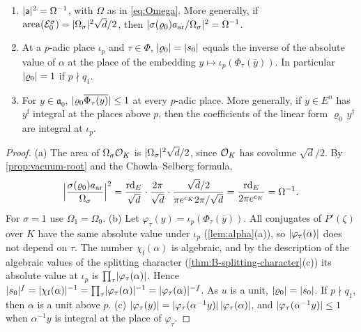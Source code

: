 \begin{proposition}\label{prop:jet-scale}
\begin{enumerate}[label=\textup{(\alph*)}]
\item $\lvert \mathsf a\rvert^2=\Omega^{-1}$, with $\Omega$ as in \eqref{eq:Omega}. More generally, if
$\mathrm{area}(\mathcal E_0^\sigma)=\lvert \Omega_\sigma\rvert^2\sqrt d/2$, then
$\lvert \sigma(\varrho_0)a_{\mathrm{ar}}/\Omega_\sigma\rvert^2=\Omega^{-1}$.
\item At a $p$-adic place $\iota_p$ and $\tau\in\Phi$, $\lvert \varrho_0\rvert=\lvert s_0\rvert$ equals the inverse
of the absolute value of $\alpha$ at the place of the embedding $y\mapsto\iota_p(\Phi_\tau(\bar y))$.
In particular $\lvert \varrho_0\rvert=1$ if $p\nmid q_1$.
\item For $y\in\mathfrak a_0$, $\lvert \varrho_0\overline{\Phi_\tau(y)}\rvert\le1$ at every $p$-adic place. More
generally, if $y\in E^n$ has $y^{\mathrm f}$ integral at the places above $p$, then the coefficients of
the linear form $\varrho_0\,y^\dagger$ are integral at $\iota_p$.
\end{enumerate}
\end{proposition}

\begin{proof}
(a) The area of $\Omega_\sigma\mathcal{O}_K$ is $\lvert \Omega_\sigma\rvert^2\sqrt d/2$, since $\mathcal{O}_K$ has covolume
$\sqrt d/2$. By \cref{prop:vacuum-root} and the Chowla--Selberg formula,
\[
  \Bigl|\frac{\sigma(\varrho_0)a_{\mathrm{ar}}}{\Omega_\sigma}\Bigr|^2
  =\frac{\mathrm{rd}_E}{\sqrt d}\cdot\frac{2\pi}{\sqrt d}\cdot\frac{\sqrt d/2}{\pi e^{c_K}2\pi/\sqrt d}
  =\frac{\mathrm{rd}_E}{2\pi e^{c_K}}=\Omega^{-1}.
\]
For $\sigma=1$ use $\Omega_1=\Omega_0$.
(b) Let $\varphi_\tau(y)=\iota_p(\Phi_\tau(\bar y))$. All conjugates of $P'(\zeta)$ over $K$ have the
same absolute value under $\iota_p$ (\cref{lem:alpha}(a)), so $\lvert \varphi_\tau(\alpha)\rvert$ does not
depend on $\tau$. The number $\chi_{\mathrm f}(\alpha)$ is algebraic, and by the description of the
algebraic values of the splitting character (\cref{thm:B-splitting-character}(c)) its absolute value
at $\iota_p$ is $\prod_\tau\lvert \varphi_\tau(\alpha)\rvert$. Hence $\lvert s_0\rvert^f=\lvert \chi_{\mathrm f}(\alpha)\rvert^{-1}=
\prod_\tau\lvert \varphi_\tau(\alpha)\rvert^{-1}=\lvert \varphi_\tau(\alpha)\rvert^{-f}$. As $u$ is a unit,
$\lvert \varrho_0\rvert=\lvert s_0\rvert$. If $p\nmid q_1$, then $\alpha$ is a unit above $p$.
(c) $\lvert \varphi_\tau(y)\rvert=\lvert \varphi_\tau(\alpha^{-1}y)\rvert\,\lvert \varphi_\tau(\alpha)\rvert$, and
$\lvert \varphi_\tau(\alpha^{-1}y)\rvert\le1$ when $\alpha^{-1}y$ is integral at the place of $\varphi_\tau$.
\end{proof}

